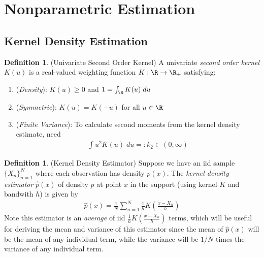\documentclass[12pt]{article}
\theoremstyle{plain}
\theoremstyle{definition}
\newtheorem{defn}[thm]{Definition}
\theoremstyle{remark}
\newcommand{\ra}{\rightarrow}
\newcommand{\sumnN}{\sum^N_{n=1}}
\newcommand{\nN}{_{n=1}^N}
\begin{document}
\clearpage
\section{Nonparametric Estimation}


\subsection{Kernel Density Estimation}

\begin{defn}(Univariate Second Order Kernel)
A univariate \emph{second order kernel} $K(u)$ is a real-valued
weighting function $K:\R\ra\R_+$ satisfying:
\begin{enumerate}[label=(\roman*)]
  \item (\emph{Density}): $K(u)\geq 0$ and
    $1=\int_\R K(u)\;du$
  \item (\emph{Symmetric}): $K(u)=K(-u)$ for all $u\in\R$
  \item (\emph{Finite Variance}): To calculate second moments from
    the kernel density estimate, need
    \begin{align*}
      \int u^2 K(u)\;du =: k_2 \in (0,\infty)
    \end{align*}
\end{enumerate}
\end{defn}

\begin{defn}(Kernel Density Estimator)
Suppose we have an iid sample $\{X_n\}\nN$ where each observation has
density $p(x)$.
The \emph{kernel density estimator} $\hat{p}(x)$ of density $p$ at point
$x$ in the support (using kernel $K$ and bandwith $h$) is given by
\begin{align}
  \hat{p}(x)
  =
  \frac{1}{N}
  \sumnN
  \frac{1}{h}
  K\left(
  \frac{x-X_n}{h}
  \right)
  \label{kernel}
\end{align}
Note this estimator is an \emph{average} of iid
$\frac{1}{h} K\left( \frac{x-X_n}{h} \right)$ terms, which will be
useful for deriving the mean and variance of this estimator since
the mean of $\hat{p}(x)$ will be the mean of any individual term, while
the variance will be $1/N$ times the variance of any individual term.
\end{defn}
\end{document}

